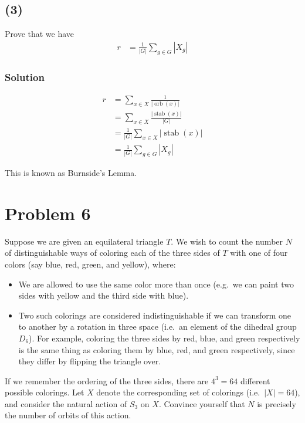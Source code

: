 \documentclass[fleqn]{article}
\DeclareMathOperator{\orb}{orb}
\DeclareMathOperator{\stab}{stab}
\begin{document}
        \pagebreak
        
        \subsection{(3)}
        Prove that we have
        \begin{align}
            r &= \frac{1}{|G|} \sum\limits_{g \in G} |X_g|
        \end{align}
            
            \subsubsection{Solution}
            \begin{align}
                r &= \sum\limits_{x \in X} \frac{1}{|\orb(x)|} \\
                    &= \sum\limits_{x \in X} \frac{|\stab(x)|}{|G|} \\
                    &= \frac{1}{|G|} \sum\limits_{x \in X} |\stab(x)| \\
                    &= \frac{1}{|G|} \sum\limits_{g \in G} |X_g|
            \end{align}
        
        This is known as Burnside's Lemma.
    
    \pagebreak
    
    \section{Problem 6}
    Suppose we are given an equilateral triangle $T$.  We wish to count the number $N$ of distinguishable ways of coloring each of the three sides of $T$ with one of four colors (say blue, red, green, and yellow), where:
    \begin{itemize}
        \item We are allowed to use the same color more than once (e.g.\ we can paint two sides with yellow and the third side with blue).
        \item Two such colorings are considered indistinguishable if we can transform one to another by a rotation in three space (i.e.\ an element of the dihedral group $D_6$). For example, coloring the three sides by red, blue, and green respectively is the same thing as coloring them by blue, red, and green respectively, since they differ by flipping the triangle over.
    \end{itemize}
    If we remember the ordering of the three sides, there are $4^3 = 64$ different possible colorings.  Let $X$ denote the corresponding set of colorings (i.e.\ $|X| = 64$), and consider the natural action of $S_3$ on $X$.  Convince yourself that $N$ is precisely the number of orbits of this action.
        
\end{document}
